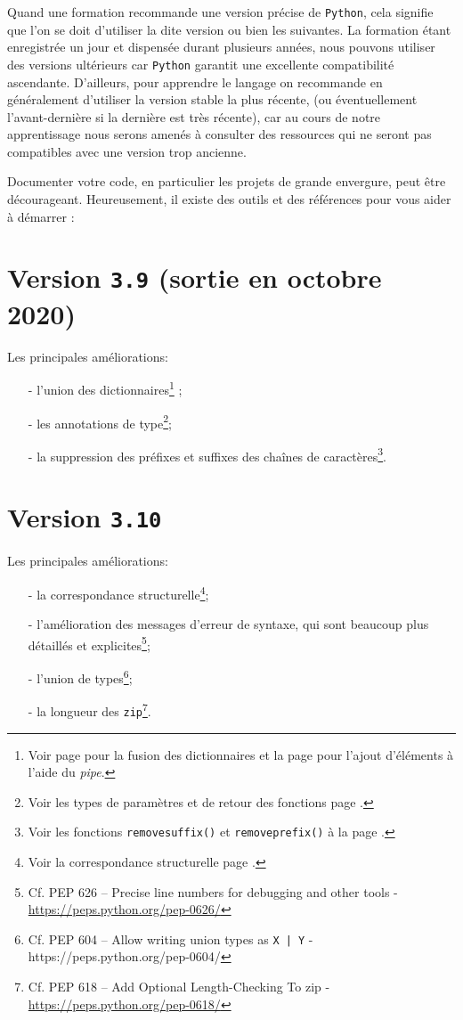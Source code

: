 \documentclass[a4paper,11pt]{book}
\begin{document}
Quand une formation recommande une version précise de \texttt{Python}, cela signifie que l'on se doit d'utiliser la dite version ou bien les suivantes. La formation étant enregistrée un jour et dispensée durant plusieurs années, nous pouvons utiliser des versions ultérieurs car \texttt{Python} garantit une excellente compatibilité ascendante. D'ailleurs, pour apprendre le langage on recommande en généralement d'utiliser la version stable la plus récente, (ou éventuellement l'avant-dernière si la dernière est très récente), car au cours de notre apprentissage nous serons amenés à consulter des ressources qui ne seront pas compatibles avec une version trop ancienne. 
\medskip

Documenter votre code, en particulier les projets de grande envergure, peut être décourageant. Heureusement, il existe des outils et des références pour vous aider à démarrer :
\section{Version \texttt{3.9} (sortie en octobre 2020)}
Les principales améliorations:
\begin{enumerate}
	\item[-] l'union des dictionnaires\footnote{Voir page \pageref{fusion_dict} pour la fusion des dictionnaires et la page \pageref{utilisation_dict} pour l'ajout d'éléments à l'aide du \og \textit{pipe}\fg{}.} ;
	\item[-] les annotations de type\footnote{Voir les types de paramètres et de retour des fonctions page \pageref{annotation_types}.};
	\item[-] la suppression des préfixes et suffixes des chaînes de caractères\footnote{Voir les fonctions \texttt{removesuffix()} et \texttt{removeprefix()} à la page \pageref{prefix_suffix}.}.
\end{enumerate}
\medskip

\section{Version \texttt{3.10}}
Les principales améliorations:
\begin{enumerate}
	\item[-] la correspondance structurelle\footnote{Voir la correspondance structurelle page \pageref{correspondance_structurelle}.};
	\item[-] l'amélioration des messages d'erreur de syntaxe, qui sont beaucoup plus détaillés et explicites\footnote{Cf. PEP 626 – Precise line numbers for debugging and other tools - \url{https://peps.python.org/pep-0626/}};
\item[-] l'union de types\footnote{Cf. PEP 604 – Allow writing union types as \texttt{X | Y} - https://peps.python.org/pep-0604/};
	\item[-] la longueur des \texttt{zip}\footnote{Cf. PEP 618 – Add Optional Length-Checking To zip - \url{https://peps.python.org/pep-0618/}}.
\end{enumerate}
\medskip
\end{document}

